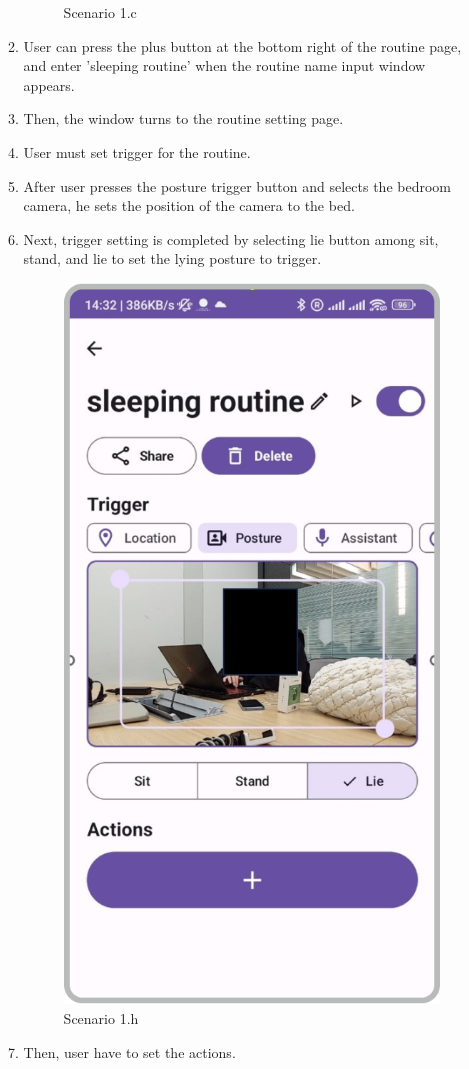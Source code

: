\begin{enumerate}
\begin{enumerate}
\begin{figure}
            \caption{Scenario 1.c}
            \label{fig:enter-label}
        \end{figure}
        \item User can press the plus button at the bottom right of the routine page, and enter 'sleeping routine' when the routine name input window appears. \\
        \item Then, the window turns to the routine setting page.\\
        \item User must set trigger for the routine. \\
        \item After user presses the posture trigger button and selects the bedroom camera, he sets the position of the camera to the bed. \\
        \item Next, trigger setting is completed by selecting lie button among sit, stand, and lie to set the lying posture to trigger.\\
        \begin{figure}
            \centering
            \includegraphics[width=0.5\linewidth]{imgs//usercase/usercase_scenario1_8.png}
            \caption{Scenario 1.h}
            \label{fig:enter-label}
        \end{figure}
        \item Then, user have to set the actions. \\

\end{enumerate}
\end{enumerate}
